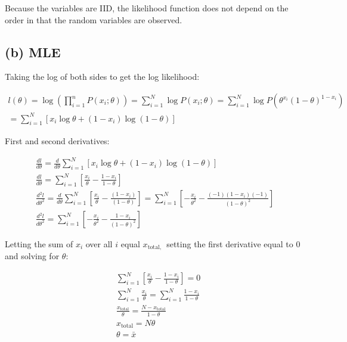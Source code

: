 \documentclass[11pt]{article}
\newcommand{\sol}[1]{{\bf{\color{magenta}{{Solution:}}}}}
\begin{document}
Because the variables are IID, the likelihood function does not depend on the order in that the random variables are observed.

\subsection{(b) MLE}
\sol x Taking the log of both sides to get the log likelihood:

$$
\begin{gathered}
l(\theta)=\log \left(\prod_{i=1}^{n} P\left(x_{i} ; \theta\right)\right)=\sum_{i=1}^{N} \log P\left(x_{i} ; \theta\right)=\sum_{i=1}^{N} \log P\left(\theta^{x_{i}}(1-\theta)^{1-x_{i}}\right) \\
=\sum_{i=1}^{N}\left[x_{i} \log \theta+\left(1-x_{i}\right) \log (1-\theta)\right]
\end{gathered}
$$

First and second derivatives:

$$
\begin{gathered}
\frac{d l}{d \theta}=\frac{d}{d \theta} \sum_{i=1}^{N}\left[x_{i} \log \theta+\left(1-x_{i}\right) \log (1-\theta)\right] \\
\frac{d l}{d \theta}=\sum_{i=1}^{N}\left[\frac{x_{i}}{\theta}-\frac{1-x_{i}}{1-\theta}\right] \\
\frac{d^{2} l}{d \theta^{2}}=\frac{d}{d \theta} \sum_{i=1}^{N}\left[\frac{x_{i}}{\theta}-\frac{\left(1-x_{i}\right)}{(1-\theta)}\right]=\sum_{i=1}^{N}\left[-\frac{x_{i}}{\theta^{2}}-\frac{(-1)\left(1-x_{i}\right)(-1)}{(1-\theta)^{2}}\right] \\
\frac{d^{2} l}{d \theta^{2}}=\sum_{i=1}^{N}\left[-\frac{x_{i}}{\theta^{2}}-\frac{1-x_{i}}{(1-\theta)^{2}}\right]
\end{gathered}
$$

Letting the sum of $x_{i}$ over all $i$ equal $x_{\text {total, }}$ setting the first derivative equal to 0 and solving for $\theta$:

$$
\begin{aligned}
& \sum_{i=1}^{N}\left[\frac{x_{i}}{\theta}-\frac{1-x_{i}}{1-\theta}\right]=0 \\
& \sum_{i=1}^{N} \frac{x_{i}}{\theta}=\sum_{i=1}^{N} \frac{1-x_{i}}{1-\theta} \\
& \frac{x_{\mathrm{total}}}{\theta}=\frac{N-x_{\mathrm{total}}}{1-\theta} \\
& x_{\mathrm{total}}=N \theta \\
& \theta=\bar{x}
\end{aligned}
$$
\end{document}
